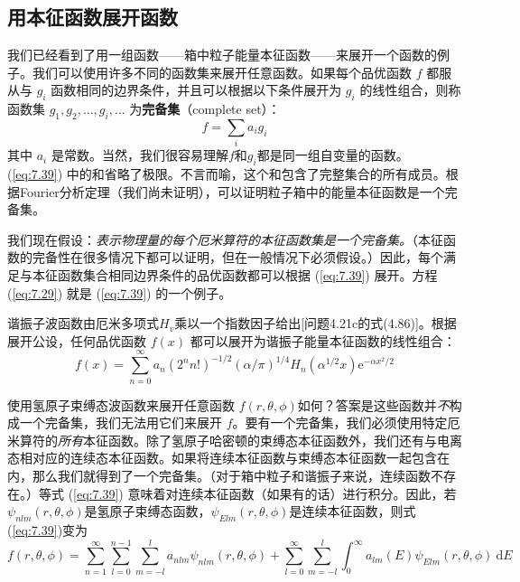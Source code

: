 \subsection*{用本征函数展开函数}

     我们已经看到了用一组函数——箱中粒子能量本征函数——来展开一个函数的例子。我们可以使用许多不同的函数集来展开任意函数。如果每个品优函数 $f$ 都服从与 $g_i$ 函数相同的边界条件，并且可以根据以下条件展开为 $g_i$ 的线性组合，则称函数集 $g_1,g_2,\ldots,g_i,\ldots$ 为\textbf{完备集}（complete set）：
    \begin{equation}
        f = \sum_{i}a_i g_i
        \label{eq:7.39}
    \end{equation}
    其中 $a_i$ 是常数。当然，我们很容易理解$f$和$g_i$都是同一组自变量的函数。(\ref{eq:7.39}) 中的和省略了极限。不言而喻，这个和包含了完整集合的所有成员。根据Fourier分析定理（我们尚未证明），可以证明粒子箱中的能量本征函数是一个完备集。

    我们现在假设：\textit{表示物理量的每个厄米算符的本征函数集是一个完备集。}（本征函数的完备性在很多情况下都可以证明，但在一般情况下必须假设。）因此，每个满足与本征函数集合相同边界条件的品优函数都可以根据 (\ref{eq:7.39}) 展开。方程 (\ref{eq:7.29}) 就是 (\ref{eq:7.39}) 的一个例子。

    谐振子波函数由厄米多项式$H_v$乘以一个指数因子给出[问题4.21c的式(4.86)]。根据展开公设，任何品优函数 $f\left(x\right)$ 都可以展开为谐振子能量本征函数的线性组合：
    \begin{equation*}
        f\left(x\right) = \sum_{n=0}^{\infty}a_n\left(2^nn!\right)^{-1/2}\left(\alpha/\pi\right)^{1/4}H_n\left(\alpha^{1/2}x\right)\mathrm{e}^{-\alpha x^2/2}
    \end{equation*}

    使用氢原子束缚态波函数来展开任意函数 $f\left(r,\theta,\phi\right)$如何？答案是这些函数并\textit{不}构成一个完备集，我们无法用它们来展开 $f$。要有一个完备集，我们必须使用特定厄米算符的\textit{所有}本征函数。除了氢原子哈密顿的束缚态本征函数外，我们还有与电离态相对应的连续态本征函数。如果将连续本征函数与束缚态本征函数一起包含在内，那么我们就得到了一个完备集。（对于箱中粒子和谐振子来说，连续函数不存在。）等式 (\ref{eq:7.39}) 意味着对连续本征函数（如果有的话）进行积分。因此，若$\psi_{nlm}\left(r,\theta,\phi\right)$是氢原子束缚态函数，$\psi_{Elm}\left(r,\theta,\phi\right)$是连续本征函数，则式(\ref{eq:7.39})变为
    \begin{equation*}
        f\left(r,\theta,\phi\right) = \sum_{n=1}^{\infty}\sum_{l=0}^{n-1}\sum_{m=-l}^{l}a_{nlm}\psi_{nlm}\left(r,\theta,\phi\right) + \sum_{l=0}^{\infty}\sum_{m=-l}^{l}\int_{0}^{\infty} a_{lm}\left(E\right) \psi_{Elm}\left(r,\theta,\phi\right) \:\mathrm{d}E
    \end{equation*}

